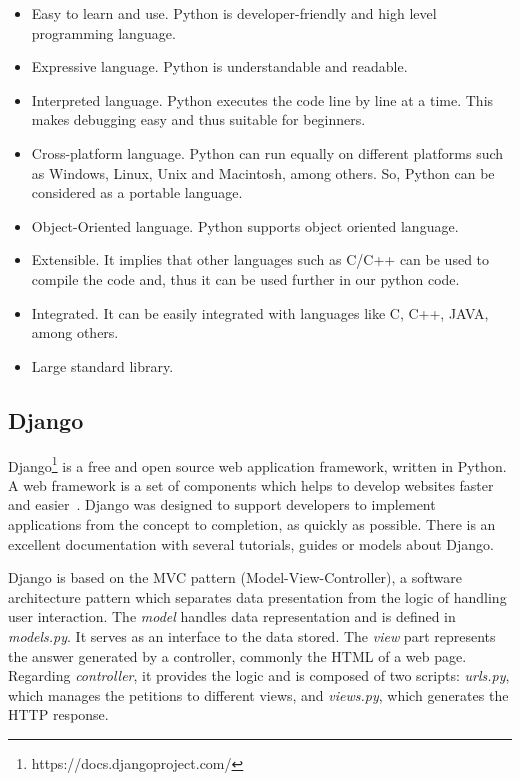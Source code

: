 \begin{itemize}
  \item Easy to learn and use. Python is developer-friendly and high level programming language.
  
  \item Expressive language. Python is understandable and readable.
  
  \item Interpreted language. Python executes the code line by line at a time. This makes debugging easy and thus suitable for beginners.
  
  \item Cross-platform language. Python can run equally on different platforms such as Windows, Linux, Unix and Macintosh, among others. So, Python can be considered as a portable language.
  
  \item Object-Oriented language. Python supports object oriented language.
  
  \item Extensible. It implies that other languages such as C/C++ can be used to compile the code and, thus it can be used further in our python code.
  
  \item Integrated. It can be easily integrated with languages like C, C++, JAVA, among others.
  
  \item Large standard library.
  
\end{itemize}



\subsection{Django}
\label{subsec:django}

Django\footnote{https://docs.djangoproject.com/} is a free and open source web application framework, written in Python. A web framework is a set of components which helps to develop websites faster and easier~\cite{djangogirls}. Django was designed to support developers to implement applications from the concept to completion, as quickly as possible. There is an excellent documentation with several tutorials, guides or models about Django.

Django is based on the MVC pattern (Model-View-Controller), a software architecture pattern which separates data presentation from the logic of handling user interaction. The \textit{model} handles data representation and is defined in \textit{models.py}. It serves as an interface to the data stored. The \textit{view} part represents the answer generated by a controller, commonly the HTML of a web page. Regarding \textit{controller}, it provides the logic and is composed of two scripts: \textit{urls.py}, which manages the petitions to different views, and \textit{views.py}, which generates the HTTP response. 


